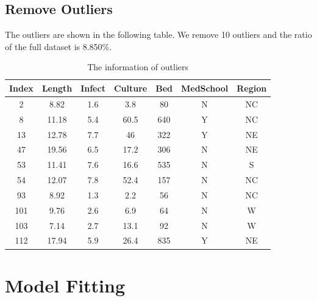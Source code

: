 \documentclass[a4paper,11pt,onecolumn,twoside]{article}
\begin{document}
\subsection{Remove Outliers}
The outliers are shown in the following table. We remove 10 outliers and the ratio of the full dataset is 8.850\%.
 \begin{table}[H]
	\centering
	\begin{tabular}{ccccccc}
		\midrule[1.5pt]
		Index & Length &Infect &Culture &Bed &MedSchool& Region\\
		\hline
	
        2    &8.82    &1.6     &3.8  &80         &N     &NC\\
		8  &11.18    &5.4    &60.5 &640         &Y     &NC\\
	    13  &12.78    &7.7      &46 &322         &Y    &NE\\
	    47   &19.56   & 6.5    &17.2 &306         &N     &NE\\
	    53  &11.41    &7.6    &16.6 &535         &N      &S\\
	    54  &12.07   & 7.8    &52.4 &157         &N     &NC\\
	    93   &8.92   & 1.3     &2.2  &56         &N     &NC\\
	 	101  & 9.76  &  2.6     &6.9  &64         &N      &W\\
	    103   &7.14  &  2.7    &13.1  &92        & N      &W\\
	    112  &17.94  &  5.9    &26.4 &835         &Y     &NE\\
		\midrule[1.5pt]
	\end{tabular}
	\caption{The information of outliers }
\end{table}
\section{Model Fitting}
\end{document}
